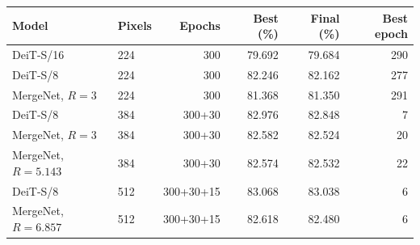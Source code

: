 \begin{tabular}{llrrrr}
\toprule
Model & Pixels & Epochs & Best (\%) & Final (\%) & Best epoch \\
\midrule
DeiT-S/16 & 224 & 300 & 79.692 & 79.684 & 290 \\
DeiT-S/8 & 224 & 300 & 82.246 & 82.162 & 277 \\
MergeNet, $R=3$ & 224 & 300 & 81.368 & 81.350 & 291 \\
DeiT-S/8 & 384 & 300+30 & 82.976 & 82.848 & 7 \\
MergeNet, $R=3$ & 384 & 300+30 & 82.582 & 82.524 & 20 \\
MergeNet, $R=5.143$ & 384 & 300+30 & 82.574 & 82.532 & 22 \\
DeiT-S/8 & 512 & 300+30+15 & 83.068 & 83.038 & 6 \\
MergeNet, $R=6.857$ & 512 & 300+30+15 & 82.618 & 82.480 & 6 \\
\bottomrule
\end{tabular}
